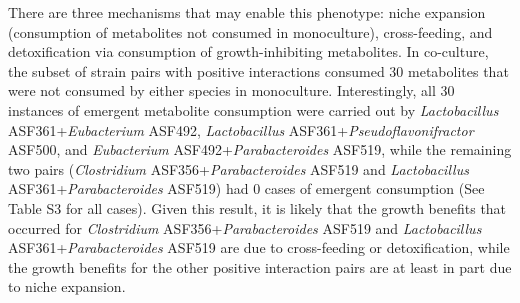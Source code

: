 \documentclass[11pt,onecolumn,notitlepage,openany,twoside]{book}
\begin{document}
\begin{refsection}
There are three mechanisms that may enable this phenotype: niche expansion (consumption of metabolites not consumed in monoculture), cross-feeding, and detoxification via consumption of growth-inhibiting metabolites. In co-culture, the subset of strain pairs with positive interactions consumed 30 metabolites that were not consumed by either species in monoculture. Interestingly, all 30 instances of emergent metabolite consumption were carried out by \textit{Lactobacillus} ASF361+\textit{Eubacterium} ASF492, \textit{Lactobacillus} ASF361+\textit{Pseudoflavonifractor} ASF500, and \textit{Eubacterium} ASF492+\textit{Parabacteroides} ASF519, while the remaining two pairs (\textit{Clostridium} ASF356+\textit{Parabacteroides} ASF519 and \textit{Lactobacillus} ASF361+\textit{Parabacteroides} ASF519) had 0 cases of emergent consumption (See Table S3 for all cases). Given this result, it is likely that the growth benefits that occurred for \textit{Clostridium} ASF356+\textit{Parabacteroides} ASF519 and \textit{Lactobacillus} ASF361+\textit{Parabacteroides} ASF519 are due to cross-feeding or detoxification, while the growth benefits for the other positive interaction pairs are at least in part due to niche expansion.


\end{refsection}
\end{document}
